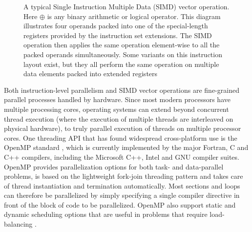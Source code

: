 \begin{figure}[ht!]
 \begin{mdframed}
 \centering
 \caption[Vector operation]{A typical Single Instruction Multiple Data (SIMD) vector operation. Here $\oplus$ is any binary arithmetic or logical operator. 
			    This diagram illustrates four operands packed into one of the special-length registers provided by the instruction set extensions.
			    The SIMD operation then applies the same operation element-wise to all the packed operands simultaneously. Some variants on this 
			    instruction layout exist, but they all perform the same operation on multiple data elements packed into extended registers}
 \label{fig_SIMD}
 \end{mdframed}
\end{figure}

Both instruction-level parallelism and SIMD vector operations are fine-grained parallel processes handled by hardware. Since most modern processors have multiple processing cores, operating systems can extend beyond concurrent thread execution 
(where the execution of multiple threads are interleaved on physical hardware), to truly parallel execution of threads on multiple processor cores. One threading API that has found widespread cross-platform use is the OpenMP standard \cite{openmp}, which is currently
implemented by the major Fortran, C and C++ compilers, including the Microsoft C++, Intel and GNU compiler suites. OpenMP provides parallelization options for both task- and data-parallel problems, is based on the lightweight fork-join threading pattern and
takes care of thread instantiation and termination automatically. Most sections and loops can therefore be parallelized by simply specifying a single compiler directive in front of the block of code to be parallelized. OpenMP also support static and dynamic
scheduling options that are useful in problems that require load-balancing \cite{openmp,akhter2006multi}.

